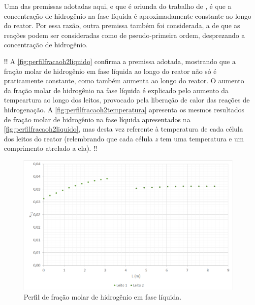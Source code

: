 Uma das premissas adotadas aqui, e que é oriunda do trabalho de
, é que a concentração de hidrogênio na
fase líquida é aproximadamente constante ao longo do reator. Por essa razão,
outra premissa também foi considerada, a de que as reações podem ser
consideradas como de pseudo-primeira ordem, desprezando a concentração de
hidrogênio.

!! A \autoref{fig:perfilfracaoh2liquido} confirma a premissa adotada, mostrando
que a fração molar de hidrogênio em fase líquida ao longo do reator não só é
praticamente constante, como também aumenta ao longo do reator. O aumento da
fração molar de hidrogênio na fase líquida é explicado pelo aumento da
tempeartura ao longo dos leitos, provocado pela liberação de calor das reações
de hidrogenação. A \autoref{fig:perfilfracaoh2temperatura} apresenta os
mesmos resultados de fração molar de hidrogênio na fase líquida
apresentados na \autoref{fig:perfilfracaoh2liquido}, mas desta vez referente à
temperatura de cada célula dos leitos do reator (relembrando que cada célula
\emph{z} tem uma temperatura e um comprimento atrelado a ela).
!!

\begin{figure}[htb]
\centering \includegraphics[scale=0.4]{images/Chap4/perfilfracaoh2liquido.png}
\caption{Perfil de fração molar de hidrogênio em fase líquida.}
\label{fig:perfilfracaoh2liquido}
\end{figure}

